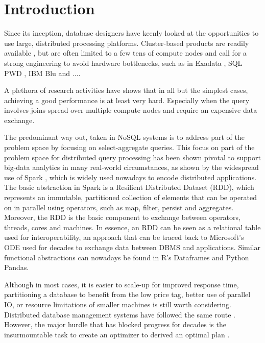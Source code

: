 \section{Introduction}
\label{Introduction}
Since its inception, database designers have keenly looked at the opportunities to use large,
distributed processing platforms. Cluster-based products are readily available \cite{},
but are often limited to a few tens of compute nodes and call for a strong engineering
to avoid hardware bottlenecks, such as in Exadata \cite{}, SQL PWD \cite{}, IBM Blu \cite{} and ....

A plethora of research activities have shows that in all but the simplest cases,
achieving a good performance is at least very hard. Especially when the query
involves joins spread over multiple compute nodes and require an expensive data exchange.

The predominant way out, taken in NoSQL systems  \cite{Casandra,Impala}
is to address part of the problem space by focusing on select-aggregate queries.
This focus on part of the problem space for distributed query processing has
been shown pivotal to support big-data analytics in many real-world circumstances,
as shown by the widespread use of Spark \cite{},
which is widely used nowadays to encode distributed applications.
The basic abstraction in Spark is a Resilient Distributed Dataset (RDD),
which represents an immutable, partitioned collection of elements that can be
operated on in parallel using operators, such as map, filter, persist and aggregates.
Moreover, the RDD is the basic component to exchange between
operators, threads, cores and machines.
In essence, an RDD can be seen as a relational table used for interoperability,
an approach that can be traced back to Microsoft's ODE \cite{} used for decades
to exchange data between DBMS and applications. Similar functional abstractions
can nowadays be found in R's Dataframes \cite{} and Python Pandas\cite{}.


Although in most cases, it is easier to scale-up for improved response time,
partitioning a database to benefit from the low price tag, better use of parallel IO,
or resource limitations of smaller machines is still worth considering.
Distributed database management systems have followed the same route \cite{distributed DB}.
However, the major hurdle that has blocked progress for decades is the insurmountable task
to create an optimizer to derived an optimal plan \cite{}.

